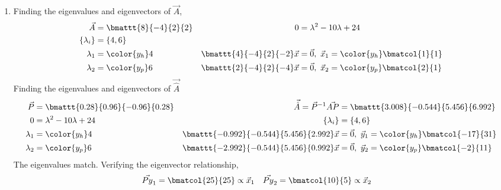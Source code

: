 \begin{enumerate}
    \item Finding the eigenvalues and eigenvectors of $ \vec{A} $,
          \begin{align}
              \vec{A}                       & = \bmattt{8}{-4}{2}{2}       &
              0                             & = \lambda^2 - 10\lambda + 24   \\
              \{\lambda_i\}                 & = \{4, 6\}                     \\
              \lambda_1                     & = \color{y_h} 4              &
              \bmattt{4}{-4}{2}{-2} \vec{x} & = \vec{0},\
              \vec{x}_1 = \color{y_h} \bmatcol{1}{1}                         \\
              \lambda_2                     & = \color{y_p} 6              &
              \bmattt{2}{-4}{2}{-4} \vec{x} & = \vec{0},\
              \vec{x}_2 = \color{y_p} \bmatcol{2}{1}
          \end{align}
          Finding the eigenvalues and eigenvectors of $ \vec{\hat{A}} $
          \begin{align}
              \vec{P}                              & = \bmattt{0.28}{0.96}
              {-0.96}{0.28}                        &
              \vec{\hat{A}} = \vec{P}^{-1}\vec{AP} & =
              \bmattt{3.008}{-0.544}{5.456}{6.992}                                  \\
              0                                    & = \lambda^2 - 10\lambda + 24 &
              \{\lambda_i\}                        & = \{4, 6\}                     \\
              \lambda_1                            & = \color{y_h} 4              &
              \bmattt{-0.992}{-0.544}{5.456}{2.992}
              \vec{x}                              & = \vec{0},\
              \vec{y}_1 = \color{y_h} \bmatcol{-17}{31}                             \\
              \lambda_2                            & = \color{y_p} 6              &
              \bmattt{-2.992}{-0.544}{5.456}{0.992}
              \vec{x}                              & = \vec{0},\
              \vec{y}_2 = \color{y_p} \bmatcol{-2}{11}
          \end{align}
          The eigenvalues match. Verifying the eigenvector relationship,
          \begin{align}
              \vec{Py}_1 & = \bmatcol{25}{25} \propto \vec{x}_1 &
              \vec{Py}_2 & = \bmatcol{10}{5} \propto \vec{x}_2
          \end{align}


\end{enumerate}
